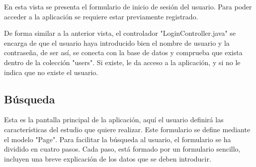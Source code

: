 En esta vista se presenta el formulario de inicio de sesión del usuario. Para poder acceder a la aplicación se requiere estar previamente registrado. 

De forma similar a la anterior vista, el controlador "LoginController.java" se encarga de que el usuario haya introducido bien el nombre de usuario y la contraseña, de ser así, se conecta con la base de datos y comprueba que exista dentro de la colección "users". Si existe, le da acceso a la aplicación, y si no le indica que no existe el usuario.
\subsection{Búsqueda} \label{sec:4.1.3}

Esta es la pantalla principal de la aplicación, aquí el usuario definirá las características del estudio que quiere realizar. 
Este formulario se define mediante el modelo "Page". Para facilitar la búsqueda al usuario, el formulario se ha dividido en cuatro pasos. Cada paso, está formado por un formulario sencillo, incluyen una breve explicación de los datos que se deben introducir.

